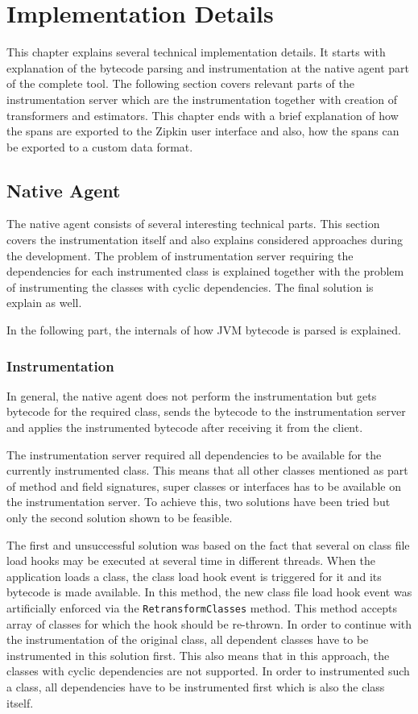 \chapter{Implementation Details}
\label{chap:implementation}
This chapter explains several technical implementation details. It starts with explanation of the bytecode parsing and instrumentation at the native agent part of the complete tool. The following section covers relevant parts of the instrumentation server which are the instrumentation together with creation of transformers and estimators. This chapter ends with a brief explanation of how the spans are exported to the Zipkin user interface and also, how the spans can be exported to a custom data format.

\section{Native Agent}
The native agent consists of several interesting technical parts. This section covers the instrumentation itself and also explains considered approaches during the development. The problem of instrumentation server requiring the dependencies for each instrumented class is explained together with the problem of instrumenting the classes with cyclic dependencies. The final solution is explain as well. 

In the following part, the internals of how JVM bytecode is parsed is explained.
\subsection{Instrumentation}
In general, the native agent does not perform the instrumentation but gets bytecode for the required class, sends the bytecode to the instrumentation server and applies the instrumented bytecode after receiving it from the client. 

The instrumentation server required all dependencies to be available for the currently instrumented class. This means that all other classes mentioned as part of method and field signatures, super classes or interfaces has to be available on the instrumentation server. To achieve this, two solutions have been tried but only the second solution shown to be feasible.

The first and unsuccessful solution was based on the fact that several on class file load hooks may be executed at several time in different threads. When the application loads a class, the class load hook event is triggered for it and its bytecode is made available. In this method, the new class file load hook event was artificially enforced via the \texttt{RetransformClasses} method. This method accepts array of classes for which the hook should be re-thrown. In order to continue with the instrumentation of the original class, all dependent classes have to be instrumented in this solution first. This also means that in this approach, the classes with cyclic dependencies are not supported. In order to instrumented such a class, all dependencies have to be instrumented first which is also the class itself.

